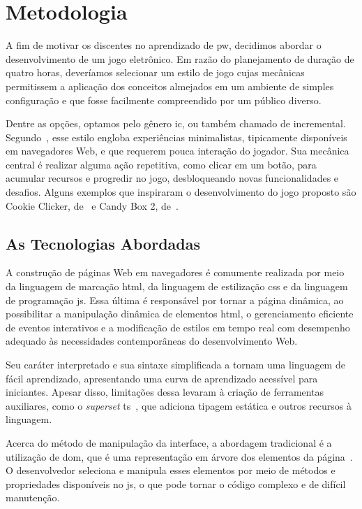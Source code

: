 \section{Metodologia}%
\label{sec:metodologia}

A fim de motivar os discentes no aprendizado de \gls{pw}, decidimos abordar o desenvolvimento de um jogo eletrônico.
Em razão do planejamento de duração de quatro horas, deveríamos selecionar um estilo de jogo cujas mecânicas permitissem a aplicação dos conceitos almejados em um ambiente de simples configuração e que fosse facilmente compreendido por um público diverso.

Dentre as opções, optamos pelo gênero \gls{ic}, ou também chamado de incremental.
Segundo~, esse estilo engloba experiências minimalistas, tipicamente disponíveis em navegadores Web, e que requerem pouca interação do jogador.
Sua mecânica central é realizar alguma ação repetitiva, como clicar em um botão, para acumular recursos e progredir no jogo, desbloqueando novas funcionalidades e desafios.
Alguns exemplos que inspiraram o desenvolvimento do jogo proposto são Cookie Clicker, de~ e Candy Box 2, de~.

\subsection{As Tecnologias Abordadas}

A construção de páginas Web em navegadores é comumente realizada por meio da linguagem de marcação \gls{html}, da linguagem de estilização \gls{css} e da linguagem de programação \gls{js}.
Essa última é responsável por tornar a página dinâmica, ao possibilitar a manipulação dinâmica de elementos \gls{html}, o gerenciamento eficiente de eventos interativos e a modificação de estilos em tempo real com desempenho adequado às necessidades contemporâneas do desenvolvimento Web.

Seu caráter interpretado e sua sintaxe simplificada a tornam uma linguagem de fácil aprendizado, apresentando uma curva de aprendizado acessível para iniciantes.
Apesar disso, limitações dessa levaram à criação de ferramentas auxiliares, como o \textit{superset} \gls{ts}~\cite{microsoft:2012:typescript}, que adiciona tipagem estática e outros recursos à linguagem.

Acerca do método de manipulação da interface, a abordagem tradicional é a utilização de \gls{dom}, que é uma representação em árvore dos elementos da página~\cite{whatwg:2025:dom_standard}.
O desenvolvedor seleciona e manipula esses elementos por meio de métodos e propriedades disponíveis no \gls{js}, o que pode tornar o código complexo e de difícil manutenção.

